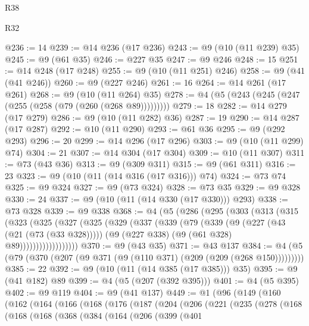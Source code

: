 \begin{lexlean}{R38}
\begin{lexlean}{R32}
\begin{coremodule}
{{{{{{{{{{{{{{{{{{{{{{{{{{{{{{{{{{{{{{{{{{{{{{{{{{{@236 := 14
@239 := @14 @236 (@17 @236)
@243 := @9 (@10 (@11 @239) @35)
@245 := @9 (@61 @35)
@246 := @227 @35
@247 := @9 @246
@248 := 15
@251 := @14 @248 (@17 @248)
@255 := @9 (@10 (@11 @251) @246)
@258 := @9 (@41 (@41 @246))
@260 := @9 (@227 @246)
@261 := 16
@264 := @14 @261 (@17 @261)
@268 := @9 (@10 (@11 @264) @35)
@278 := @4 (@5 (@243 (@245 (@247 (@255 (@258 (@79 (@260 (@268 @89)))))))))
@279 := 18
@282 := @14 @279 (@17 @279)
@286 := @9 (@10 (@11 @282) @36)
@287 := 19
@290 := @14 @287 (@17 @287)
@292 := @10 (@11 @290)
@293 := @61 @36
@295 := @9 (@292 @293)
@296 := 20
@299 := @14 @296 (@17 @296)
@303 := @9 (@10 (@11 @299) @74)
@304 := 21
@307 := @14 @304 (@17 @304)
@309 := @10 (@11 @307)
@311 := @73 (@43 @36)
@313 := @9 (@309 @311)
@315 := @9 (@61 @311)
@316 := 23
@323 := @9 (@10 (@11 (@14 @316 (@17 @316))) @74)
@324 := @73 @74
@325 := @9 @324
@327 := @9 (@73 @324)
@328 := @73 @35
@329 := @9 @328
@330 := 24
@337 := @9 (@10 (@11 (@14 @330 (@17 @330))) @293)
@338 := @73 @328
@339 := @9 @338
@368 := @4
    (@5
      (@286
        (@295
          (@303
            (@313
              (@315
                (@323
                  (@325
                    (@327
                      (@325
                        (@329
                          (@337
                            (@339
                              (@79
                                (@339
                                  (@9
                                    (@227 (@43 (@21 (@73 (@33 @328)))))
                                    (@9 (@227 @338) (@9 (@61 @328) @89))))))))))))))))))
@370 := @9 (@43 @35)
@371 := @43 @137
@384 := @4 (@5 (@79 (@370 (@207 (@9 @371 (@9 (@110 @371) (@209 (@209 (@268 @150)))))))))
@385 := 22
@392 := @9 (@10 (@11 (@14 @385 (@17 @385))) @35)
@395 := @9 (@41 @182) @89
@399 := @4 (@5 (@207 (@392 @395)))
@401 := @4 (@5 @395)
@402 := @9 @119
@404 := @9 (@41 @137)
@449 := @1
    (@96
      (@149
        (@160
          (@162
            (@164
              (@166
                (@168
                  (@176
                    (@187
                      (@204
                        (@206
                          (@221
                            (@235
                              (@278
                                (@168
                                  (@168
                                    (@168
                                      (@368
                                        (@384
                                          (@164
                                            (@206
                                              (@399
                                                (@401
}}}}}}}}}}}}}}}}}}}}}}}}}}}}}}}}}}}}}}}}}}}}}}}}}}}
\end{coremodule}
\end{lexlean}
\end{lexlean}
